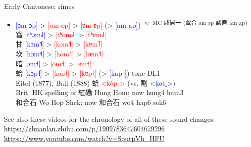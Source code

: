 \documentclass{beamer}
\begin{document}
\begin{frame}[fragile]{Early Cantonese: rimes}

{\footnotesize
\begin{itemize}
    \item {\textcolor{blue}{[ɔm ɔp]} > \textcolor{red}{[om op]} > \textcolor{red}{[ɐm ɐp]} (> \textcolor{blue}{[am ap]})} \textsuperscript{$\approx$ MC 咸開一 (覃合 əm ǝp 談盍 am ap)}\\ 
    窞 \textcolor{blue}{[tʰɔm˩˧]} > \textcolor{red}{[tʰom˩˧]} > \textcolor{red}{[tʰɐm˩˧]}\\ 
    甘 \textcolor{blue}{[kɔm˥˧]} > \textcolor{red}{[kom˥˧]} > \textcolor{red}{[kɐm˥]}\\ 
    坎 \textcolor{blue}{[hɔm˧˥]} > \textcolor{red}{[hom˧˥]} > \textcolor{red}{[hɐm˧˥]}\\ 
    暗 \textcolor{blue}{[ɔm˧]} > \textcolor{red}{[om˧]} > \textcolor{red}{[ɐm˧]}\\ 
    蛤 \textcolor{blue}{[kɔp˧]} > \textcolor{red}{[kop˧]} > \textcolor{red}{[kɐp˧]} (> \textcolor{blue}{[kap˧]}) tone DL1\\
    \bigskip
    Eitel (1877), Ball (1888) 蛤 \textcolor{red}{<kòp˳>} (vs. 割 \textcolor{blue}{<kot˳>}) \\
    \smallskip
    Brit. HK spelling of 紅磡 Hung Hom; now hung4 ham3\\
    \quad 和合石 Wo Hop Shek; now 和合石 wo4 hap6 sek6\\
\end{itemize}}

\bigskip
{\footnotesize See also these videos for the chronology of all of these sound changes:}\\
\bigskip
{\tiny \url{https://zhuanlan.zhihu.com/p/1909783647604679296}\\ \url{https://www.youtube.com/watch?v=SoutpVh_HFU}}

\end{frame}
\end{document}
